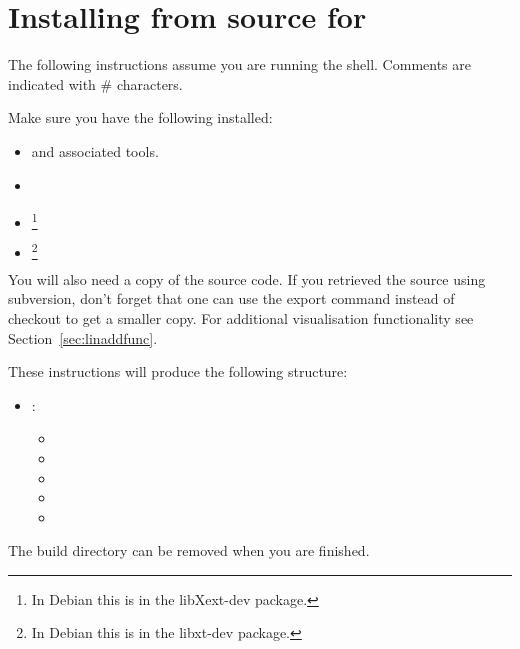 
%
%
%

\section{Installing from source for \linux}
\label{sec:srclinux}
The following instructions assume you are running the  shell.
Comments are indicated with \# characters.

Make sure you have the following installed:
\begin{itemize}
 \item {} and associated tools.
\item {}
\item {}\footnote{In Debian this is in the libXext-dev package.}
\item {}\footnote{In Debian this is in the libxt-dev package.}
\end{itemize}

You will also need a copy of the \esfinley source code.
If you retrieved the source using subversion, don't forget that one can use the export command instead of checkout to get a smaller copy.
For additional visualisation functionality see Section~\ref{sec:linaddfunc}.

These instructions will produce the following structure:
\begin{itemize}
\item {}: \begin{itemize}
 \item {}
\item {}
\item {}
\item {}
\item {}
  \end{itemize}
\end{itemize}

The build directory can be removed when you are finished.

